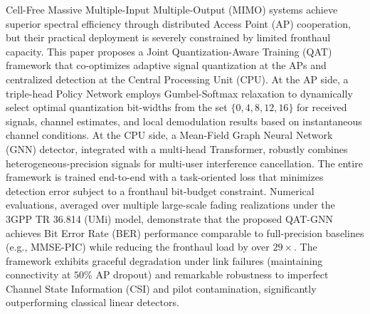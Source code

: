 Cell-Free Massive Multiple-Input Multiple-Output (MIMO) systems achieve superior spectral efficiency through distributed Access Point (AP) cooperation, but their practical deployment is severely constrained by limited fronthaul capacity. This paper proposes a Joint Quantization-Aware Training (QAT) framework that co-optimizes adaptive signal quantization at the APs and centralized detection at the Central Processing Unit (CPU). At the AP side, a triple-head Policy Network employs Gumbel-Softmax relaxation to dynamically select optimal quantization bit-widths from the set $\{0, 4, 8, 12, 16\}$ for received signals, channel estimates, and local demodulation results based on instantaneous channel conditions. At the CPU side, a Mean-Field Graph Neural Network (GNN) detector, integrated with a multi-head Transformer, robustly combines heterogeneous-precision signals for multi-user interference cancellation. The entire framework is trained end-to-end with a task-oriented loss that minimizes detection error subject to a fronthaul bit-budget constraint. Numerical evaluations, averaged over multiple large-scale fading realizations under the 3GPP TR 36.814 (UMi) model, demonstrate that the proposed QAT-GNN achieves Bit Error Rate (BER) performance comparable to full-precision baselines (e.g., MMSE-PIC) while reducing the fronthaul load by over $29\times$. The framework exhibits graceful degradation under link failures (maintaining connectivity at $50\%$ AP dropout) and remarkable robustness to imperfect Channel State Information (CSI) and pilot contamination, significantly outperforming classical linear detectors.